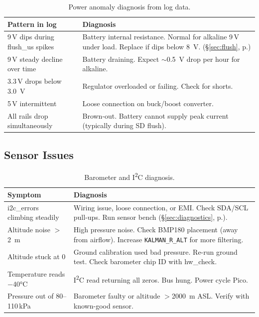 \documentclass[11pt, a4paper, twoside]{article}
\newcommand{\config}[1]{\texttt{#1}}
\newcommand{\xref}[1]{(\S\ref{#1}, p.\pageref{#1})}
\begin{document}
\begin{table}[ht]
\centering
\small
\caption{Power anomaly diagnosis from log data.}
\label{tab:power-diag}
\begin{tabularx}{\textwidth}{l X}
\toprule
\textbf{Pattern in log} & \textbf{Diagnosis} \\
\midrule
9\,V dips during flush\_us spikes & Battery internal resistance. Normal for alkaline 9\,V under load. Replace if dips below \SI{8}{\volt}. \xref{sec:flush} \\
9\,V steady decline over time & Battery draining. Expect $\sim$\SI{0.5}{\volt} drop per hour for alkaline. \\
3.3\,V drops below \SI{3.0}{\volt} & Regulator overloaded or failing. Check for shorts. \\
5\,V intermittent & Loose connection on buck/boost converter. \\
All rails drop simultaneously & Brown-out. Battery cannot supply peak current (typically during SD flush). \\
\bottomrule
\end{tabularx}
\end{table}

\subsection{Sensor Issues}

\begin{table}[ht]
\centering
\small
\caption{Barometer and I\textsuperscript{2}C diagnosis.}
\label{tab:sensor-diag}
\begin{tabularx}{\textwidth}{l X}
\toprule
\textbf{Symptom} & \textbf{Diagnosis} \\
\midrule
i2c\_errors climbing steadily & Wiring issue, loose connection, or EMI. Check SDA/SCL pull-ups. Run sensor bench \xref{sec:diagnostics}. \\
Altitude noise $>$\SI{2}{\metre} & High pressure noise. Check BMP180 placement (away from airflow). Increase \config{KALMAN\_R\_ALT} for more filtering. \\
Altitude stuck at 0 & Ground calibration used bad pressure. Re-run ground test. Check barometer chip ID with hw\_check. \\
Temperature reads $-$40\si{\degreeCelsius} & I\textsuperscript{2}C read returning all zeros. Bus hung. Power cycle Pico. \\
Pressure out of 80--110\,kPa & Barometer faulty or altitude $>$\SI{2000}{\metre} ASL. Verify with known-good sensor. \\
\bottomrule
\end{tabularx}
\end{table}
\end{document}
